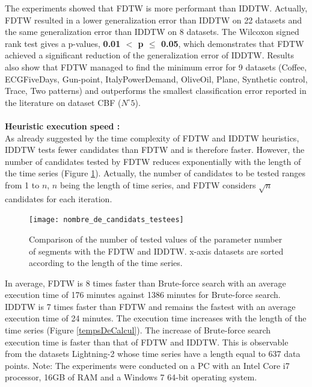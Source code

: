 The experiments showed that FDTW is more performant than IDDTW. Actually, FDTW resulted in a
lower generalization error than IDDTW on 22 datasets and the same generalization error than IDDTW on 8
datasets.  The Wilcoxon signed rank test gives a
p-values, \textbf{ 0.01 $<$ p $\leq$ 0.05}, which demonstrates that FDTW achieved a
significant reduction of the generalization error of IDDTW. Results also show that FDTW managed to
find the minimum error for 9 datasets (Coffee, ECGFiveDays, Gun-point, ItalyPowerDemand, OliveOil, Plane, Synthetic control, Trace, Two
patterns) and outperforms the smallest classification error reported in the literature on
dataset CBF ($N^{\circ} 5$).




\paragraph{}\textbf{Heuristic execution speed : }\\
As already suggested by the time complexity of  FDTW and IDDTW heuristics, IDDTW
tests fewer candidates than FDTW and is therefore faster. However, the number of candidates tested
by FDTW reduces exponentially with the length of the time series (Figure
\ref{NumberOfValuesTested}).
Actually, the number of candidates to be tested ranges from 1 to $n$, $n$ being the  length of time
series, and FDTW considers $\sqrt{n}$ candidates for each iteration.



\begin{figure}
\center
\texttt{[image: nombre\_de\_candidats\_testees]}
\caption{Comparison of the number of tested values of the parameter number of segments with
the FDTW and IDDTW. x-axis datasets are sorted according to
the length of the time series. }

\label{NumberOfValuesTested}

\end{figure}

In average, FDTW is 8 times faster than Brute-force search with an average execution time of 176 minutes
against 1386 minutes for Brute-force search. IDDTW is 7 times faster than FDTW and remains
the fastest with an average execution time of 24 minutes. The execution time increases with the length of the time series (Figure 
\ref{tempsDeCalcul}). The increase of Brute-force search execution time is faster than that of FDTW
and IDDTW. This is observable from the datasets Lightning-2 whose time series have a length equal
to 637 data points. Note: The experiments were conducted on a PC with an Intel Core i7 processor, 16GB of RAM and a Windows 7 64-bit operating system.

